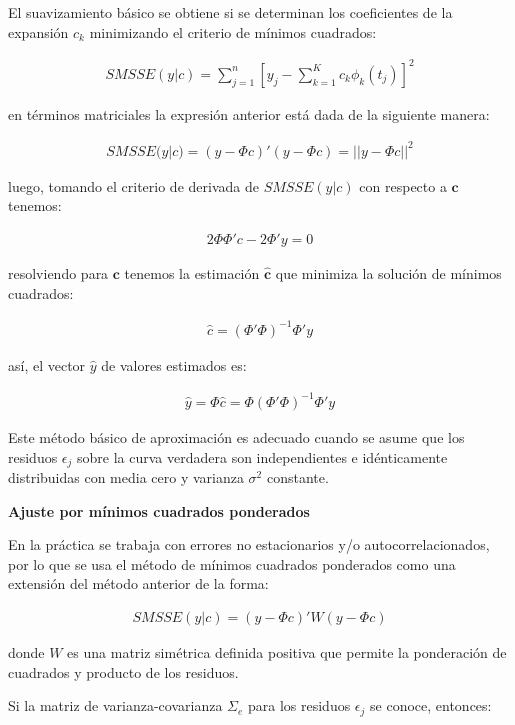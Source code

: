 \documentclass[
]{book}
\begin{document}
El suavizamiento básico se obtiene si se determinan los coeficientes de la expansión \(c_k\) minimizando el criterio de mínimos cuadrados:

\begin{align}
    SMSSE(y|c)=\sum_{j=1}^n[y_j-\sum_{k=1}^Kc_k\phi_k(t_j)]^2
\end{align}

en términos matriciales la expresión anterior está dada de la siguiente manera:

\begin{align}
    SMSSE(y|c)=(y-\Phi c)'(y-\Phi c)=||y-\Phi c||^2
\end{align}

luego, tomando el criterio de derivada de \(SMSSE(y|c)\) con respecto a \(\textbf{c}\) tenemos:

\begin{align}
    2\Phi \Phi'c-2\Phi'y=0
\end{align}

resolviendo para \(\textbf{c}\) tenemos la estimación \({\hat{\textbf{c}}}\) que minimiza la solución de mínimos cuadrados:

\begin{align}
    {\hat{c}}=(\Phi'\Phi)^{-1}\Phi'y
\end{align}

así, el vector \({\hat{y}}\) de valores estimados es:

\begin{align}
    {\hat{y}}=\Phi {\hat{c}}=\Phi(\Phi'\Phi)^{-1}\Phi'y
\end{align}

Este método básico de aproximación es adecuado cuando se asume que los residuos \(\epsilon_j\) sobre la curva verdadera son independientes e idénticamente distribuidas con media cero y varianza \(\sigma^2\) constante.

\textbf{Ajuste por mínimos cuadrados ponderados}

En la práctica se trabaja con errores no estacionarios y/o autocorrelacionados, por lo que se usa el método de mínimos cuadrados ponderados como una extensión del método anterior de la forma:

\begin{align}
    SMSSE(y|c)=(y-\Phi c)'W(y-\Phi c)
\end{align}

donde \(W\) es una matriz simétrica definida positiva que permite la ponderación de cuadrados y producto de los residuos.

Si la matriz de varianza-covarianza \(\Sigma_e\) para los residuos \(\epsilon_j\) se conoce, entonces:
\end{document}
